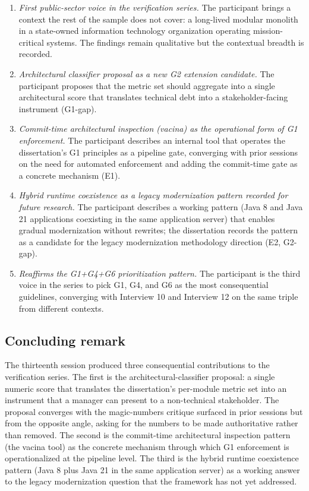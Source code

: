 \begin{enumerate}[itemsep=4pt,topsep=2pt]
  \item \emph{First public-sector voice in the verification series.} The participant brings a context the rest of the sample does not cover: a long-lived modular monolith in a state-owned information technology organization operating mission-critical systems. The findings remain qualitative but the contextual breadth is recorded.
  \item \emph{Architectural classifier proposal as a new G2 extension candidate.} The participant proposes that the metric set should aggregate into a single architectural score that translates technical debt into a stakeholder-facing instrument (G1-gap).
  \item \emph{Commit-time architectural inspection (vacina) as the operational form of G1 enforcement.} The participant describes an internal tool that operates the dissertation's G1 principles as a pipeline gate, converging with prior sessions on the need for automated enforcement and adding the commit-time gate as a concrete mechanism (E1).
  \item \emph{Hybrid runtime coexistence as a legacy modernization pattern recorded for future research.} The participant describes a working pattern (Java 8 and Java 21 applications coexisting in the same application server) that enables gradual modernization without rewrites; the dissertation records the pattern as a candidate for the legacy modernization methodology direction (E2, G2-gap).
  \item \emph{Reaffirms the G1+G4+G6 prioritization pattern.} The participant is the third voice in the series to pick G1, G4, and G6 as the most consequential guidelines, converging with Interview 10 and Interview 12 on the same triple from different contexts.
\end{enumerate}

\subsection*{Concluding remark}

The thirteenth session produced three consequential contributions to the verification series. The first is the architectural-classifier proposal: a single numeric score that translates the dissertation's per-module metric set into an instrument that a manager can present to a non-technical stakeholder. The proposal converges with the magic-numbers critique surfaced in prior sessions but from the opposite angle, asking for the numbers to be made authoritative rather than removed. The second is the commit-time architectural inspection pattern (the vacina tool) as the concrete mechanism through which G1 enforcement is operationalized at the pipeline level. The third is the hybrid runtime coexistence pattern (Java 8 plus Java 21 in the same application server) as a working answer to the legacy modernization question that the framework has not yet addressed.
